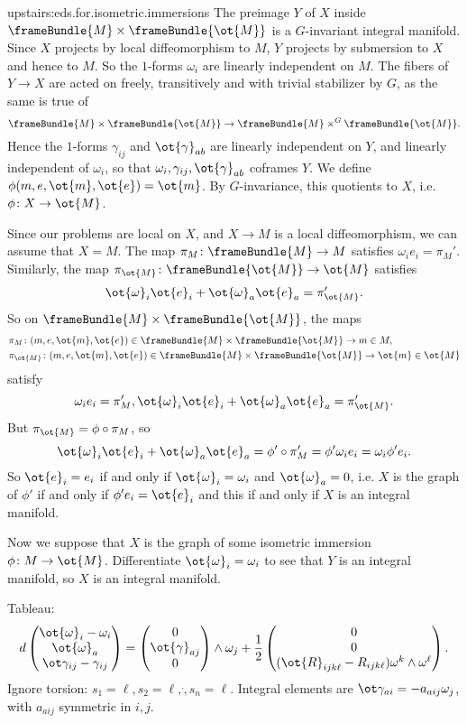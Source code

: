 \begin{answer}{upstairs:eds.for.isometric.immersions}
The preimage \(Y\) of \(X\) inside \(\frameBundle{M} \times \frameBundle{\ot{M}}\) is a \(G\)-invariant integral manifold.
Since \(X\) projects by local diffeomorphism to \(M\), \(Y\) projects by submersion to \(X\) and hence to \(M\).
So the \(1\)-forms \(\omega_i\) are linearly independent on \(M\).
The fibers of \(Y \to X\) are acted on freely, transitively and with trivial stabilizer by \(G\), as the same is true of 
\[
\frameBundle{M} \times \frameBundle{\ot{M}} \to \frameBundle{M} \times^G \frameBundle{\ot{M}}.
\]
Hence the \(1\)-forms \(\gamma_{ij}\) and \(\ot{\gamma}_{ab}\) are linearly independent on \(Y\), and linearly independent of \(\omega_i\), so that \(\omega_i,\gamma_{ij},\ot{\gamma}_{ab}\) coframes \(Y\).
We define \(\phi(m,e,\ot{m},\ot{e})=\ot{m}\).
By \(G\)-invariance, this quotients to \(X\), i.e. \(\phi \colon X \to \ot{M}\).

Since our problems are local on \(X\), and \(X\to M\) is a local diffeomorphism, we can assume that \(X=M\).
The map \(\pi_M \colon \frameBundle{M} \to M\) satisfies \(\omega_i e_i = \pi_M'\).
Similarly, the map \(\pi_{\ot{M}} \colon \frameBundle{\ot{M}} \to \ot{M}\) satisfies 
\[
\ot{\omega}_i \ot{e}_i+\ot{\omega}_a \ot{e}_a = \pi_{\ot{M}}'.
\]
So on \(\frameBundle{M} \times \frameBundle{\ot{M}}\), the maps
\begin{align*}
&\pi_M \colon (m,e,\ot{m},\ot{e}) \in \frameBundle{M} \times \frameBundle{\ot{M}} \to m \in M,\\
&\pi_{\ot{M}} \colon (m,e,\ot{m},\ot{e}) \in  \frameBundle{M} \times \frameBundle{\ot{M}} \to \ot{m} \in \ot{M}
\end{align*}
satisfy
\[
\omega_i e_i = \pi_M', \ot{\omega}_i \ot{e}_i+\ot{\omega}_a \ot{e}_a= \pi_{\ot{M}}'.
\]
But \(\pi_{\ot{M}} = \phi \circ \pi_M\), so
\[
\ot{\omega}_i \ot{e}_i+\ot{\omega}_a \ot{e}_a=\phi' \circ \pi_M' = \phi' \omega_ie_i = \omega_i \phi' e_i.
\]
So \(\ot{e}_i=e_i\) if and only if \(\ot{\omega}_i=\omega_i\) and \(\ot{\omega}_a=0\), i.e. \(X\) is the graph of \(\phi'\) if and only if \(\phi'e_i=\ot{e}_i\) and this if and only if \(X\) is an integral manifold.

Now we suppose that \(X\) is the graph of some isometric immersion \(\phi \colon M \to \ot{M}\).
Differentiate \(\ot{\omega}_i=\omega_i\) to see that \(Y\) is an integral manifold, so \(X\) is an integral manifold.
\end{answer}
Tableau:
\[
d
\begin{pmatrix}
\ot{\omega}_i-\omega_i\\
\ot{\omega}_a\\
\ot\gamma_{ij}-\gamma_{ij}
\end{pmatrix}
=
\begin{pmatrix}
0\\
\ot{\gamma}_{aj}\\
0
\end{pmatrix}
\wedge\omega_j
+
\frac{1}{2}
\begin{pmatrix}
0\\
0\\
(\ot{R}_{ijk\ell}-R_{ijk\ell})\omega^k\wedge\omega^{\ell}
\end{pmatrix}.
\]
Ignore torsion: \(s_1=\ell,s_2=\ell,\dot,s_n=\ell\).
Integral elements are \(\ot\gamma_{ai}=-a_{aij} \omega_j\), with \(a_{aij}\) symmetric in \(i,j\).
